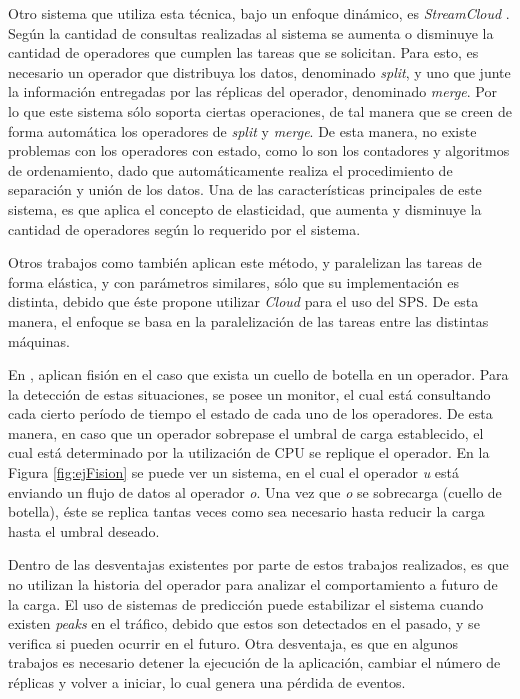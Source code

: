 Otro sistema que utiliza esta t\'ecnica, bajo un enfoque din\'amico, es \textit{StreamCloud} \citep{GulisanoJPSV12}. Seg\'un la cantidad de consultas realizadas al sistema se aumenta o disminuye la cantidad de operadores que cumplen las tareas que se solicitan. Para esto, es necesario un operador que distribuya los datos, denominado \textit{split}, y uno que junte la informaci\'on entregadas por las r\'eplicas del operador, denominado \textit{merge}. \normalsize{Por lo que} este sistema s\'olo soporta ciertas operaciones, de tal manera que se creen de forma autom\'atica los operadores de \textit{split} y \textit{merge}. De esta manera, no existe problemas con los operadores con estado, como lo son los contadores y algoritmos de ordenamiento, dado que autom\'aticamente realiza el procedimiento de separaci\'on y uni\'on de los datos. Una de las caracter\'isticas principales de este sistema, es que aplica el concepto de elasticidad, que aumenta y disminuye la cantidad de operadores seg\'un lo requerido por el sistema.

Otros trabajos como \citep{GedikSHW14, SchneiderAGBW09} tambi\'en aplican este m\'etodo, y paralelizan las tareas de forma el\'astica, y con par\'ametros similares, s\'olo que su implementaci\'on es distinta, debido que \'este propone utilizar \textit{Cloud} para el uso del SPS. De esta manera, el enfoque se basa en la paralelizaci\'on de las tareas entre las distintas m\'aquinas.

En \citep{FernandezMKP13}, aplican fisi\'on en el caso que exista un cuello de botella en un operador. Para la detecci\'on de estas situaciones, se posee un monitor, el cual est\'a consultando cada cierto per\'iodo de tiempo el estado de cada uno de los operadores. De esta manera, en caso que un operador sobrepase el umbral de carga establecido, el cual est\'a determinado por la utilizaci\'on de CPU se replique el operador. En la Figura \ref{fig:ejFision} se puede ver un sistema, en el cual el operador \textit{u} est\'a enviando un flujo de datos al operador \textit{o}. Una vez que \textit{o} se sobrecarga (cuello de botella),\normalsize{ \'este se replica tantas veces como sea necesario hasta reducir la carga hasta el umbral deseado.}

Dentro de las desventajas existentes por parte de estos trabajos realizados, es que no utilizan la historia del operador para analizar el comportamiento a futuro de la carga. El uso de sistemas de predicci\'on puede estabilizar el sistema cuando existen \textit{peaks} en el tr\'afico, debido que estos son detectados en el pasado, y se verifica si pueden ocurrir en el futuro. \normalsize{Otra} desventaja, es que en algunos trabajos es necesario detener la ejecuci\'on de la aplicaci\'on, cambiar el n\'umero de r\'eplicas y volver a iniciar, lo cual genera una p\'erdida de eventos.


